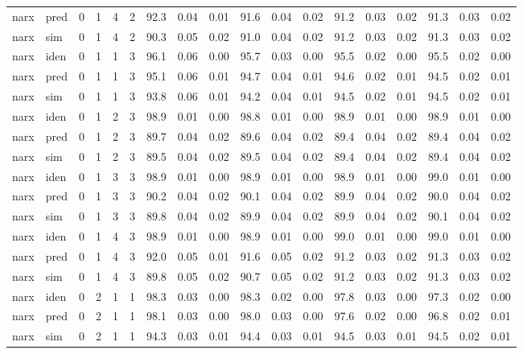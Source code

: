 \begin{landscape}
\begin{center}
\begin{longtable}{ll|cccc|ccc|ccc|ccc|ccc}
narx & pred & 0 & 1 & 4 & 2 & 92.3 & 0.04 & 0.01 & 91.6 & 0.04 & 0.02 & 91.2 & 0.03 & 0.02 & 91.3 & 0.03 & 0.02 \\ 
narx & sim  & 0 & 1 & 4 & 2 & 90.3 & 0.05 & 0.02 & 91.0 & 0.04 & 0.02 & 91.2 & 0.03 & 0.02 & 91.3 & 0.03 & 0.02 \\ 
 \hline 
narx & iden & 0 & 1 & 1 & 3 & 96.1 & 0.06 & 0.00 & 95.7 & 0.03 & 0.00 & 95.5 & 0.02 & 0.00 & 95.5 & 0.02 & 0.00 \\ 
narx & pred & 0 & 1 & 1 & 3 & 95.1 & 0.06 & 0.01 & 94.7 & 0.04 & 0.01 & 94.6 & 0.02 & 0.01 & 94.5 & 0.02 & 0.01 \\ 
narx & sim  & 0 & 1 & 1 & 3 & 93.8 & 0.06 & 0.01 & 94.2 & 0.04 & 0.01 & 94.5 & 0.02 & 0.01 & 94.5 & 0.02 & 0.01 \\ 
 \hline 
narx & iden & 0 & 1 & 2 & 3 & 98.9 & 0.01 & 0.00 & 98.8 & 0.01 & 0.00 & 98.9 & 0.01 & 0.00 & 98.9 & 0.01 & 0.00 \\ 
narx & pred & 0 & 1 & 2 & 3 & 89.7 & 0.04 & 0.02 & 89.6 & 0.04 & 0.02 & 89.4 & 0.04 & 0.02 & 89.4 & 0.04 & 0.02 \\ 
narx & sim  & 0 & 1 & 2 & 3 & 89.5 & 0.04 & 0.02 & 89.5 & 0.04 & 0.02 & 89.4 & 0.04 & 0.02 & 89.4 & 0.04 & 0.02 \\ 
 \hline 
narx & iden & 0 & 1 & 3 & 3 & 98.9 & 0.01 & 0.00 & 98.9 & 0.01 & 0.00 & 98.9 & 0.01 & 0.00 & 99.0 & 0.01 & 0.00 \\ 
narx & pred & 0 & 1 & 3 & 3 & 90.2 & 0.04 & 0.02 & 90.1 & 0.04 & 0.02 & 89.9 & 0.04 & 0.02 & 90.0 & 0.04 & 0.02 \\ 
narx & sim  & 0 & 1 & 3 & 3 & 89.8 & 0.04 & 0.02 & 89.9 & 0.04 & 0.02 & 89.9 & 0.04 & 0.02 & 90.1 & 0.04 & 0.02 \\ 
 \hline 
narx & iden & 0 & 1 & 4 & 3 & 98.9 & 0.01 & 0.00 & 98.9 & 0.01 & 0.00 & 99.0 & 0.01 & 0.00 & 99.0 & 0.01 & 0.00 \\ 
narx & pred & 0 & 1 & 4 & 3 & 92.0 & 0.05 & 0.01 & 91.6 & 0.05 & 0.02 & 91.2 & 0.03 & 0.02 & 91.3 & 0.03 & 0.02 \\ 
narx & sim  & 0 & 1 & 4 & 3 & 89.8 & 0.05 & 0.02 & 90.7 & 0.05 & 0.02 & 91.2 & 0.03 & 0.02 & 91.3 & 0.03 & 0.02 \\ 
 \hline 
narx & iden & 0 & 2 & 1 & 1 & 98.3 & 0.03 & 0.00 & 98.3 & 0.02 & 0.00 & 97.8 & 0.03 & 0.00 & 97.3 & 0.02 & 0.00 \\ 
narx & pred & 0 & 2 & 1 & 1 & 98.1 & 0.03 & 0.00 & 98.0 & 0.03 & 0.00 & 97.6 & 0.02 & 0.00 & 96.8 & 0.02 & 0.01 \\ 
narx & sim  & 0 & 2 & 1 & 1 & 94.3 & 0.03 & 0.01 & 94.4 & 0.03 & 0.01 & 94.5 & 0.03 & 0.01 & 94.5 & 0.02 & 0.01 \\ 

\end{longtable}
\end{center}
\end{landscape}
